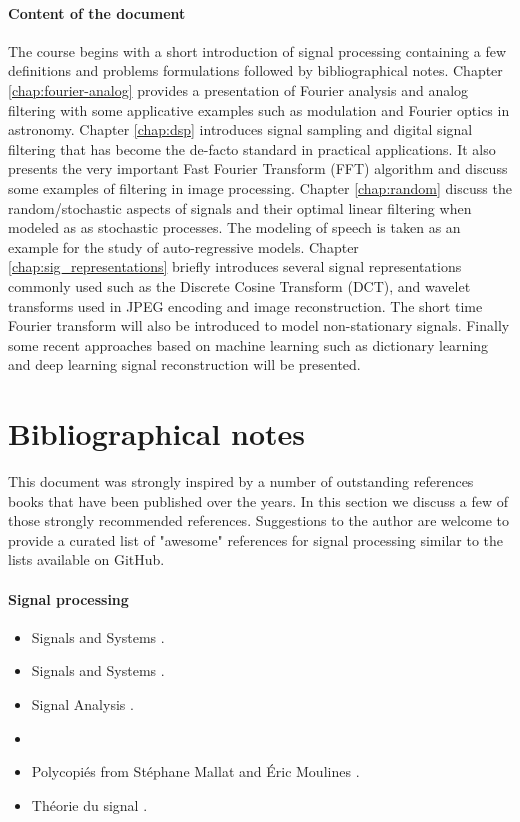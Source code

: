 \paragraph{Content of the document} The course begins with a short introduction
of signal processing containing a few definitions and problems formulations
followed by bibliographical notes. Chapter \ref{chap:fourier-analog} provides 
a presentation of Fourier analysis and analog filtering
with some applicative examples such as modulation and Fourier optics in
astronomy. Chapter \ref{chap:dsp} introduces signal sampling and digital signal filtering that has
become the de-facto standard in practical applications. It also presents the very
important Fast Fourier Transform (FFT) algorithm and discuss some examples of
filtering in image processing. Chapter \ref{chap:random} discuss the random/stochastic aspects of signals and their optimal linear
filtering when modeled as as stochastic processes. The
modeling of speech is taken as an example for the study of
auto-regressive models. Chapter \ref{chap:sig_representations} briefly
introduces  several
signal representations commonly used such as the Discrete Cosine Transform
(DCT), and wavelet transforms used in
JPEG encoding and image reconstruction. The short time Fourier transform will also be introduced to model
non-stationary signals. Finally some recent approaches based on machine learning
such as dictionary learning and deep learning signal reconstruction will be
presented.


\section{Bibliographical notes}

This document was strongly inspired by a number of outstanding references books that
have been published over the years. In this section we discuss a few of those
strongly recommended references.  Suggestions to the author are
welcome to provide a curated list of "awesome" references for signal processing
similar to the lists available on GitHub. 

\paragraph{Signal processing}

\begin{itemize}
    
    \item Signals and Systems \cite{haykin2007signals}.
    \item Signals and Systems \cite{oppenheim1997signals}.
    \item Signal Analysis \cite{papoulis1977signal}.
    \item[] \hspace{1cm}
    
    \item Polycopiés from Stéphane Mallat and Éric Moulines \cite{mallat2015traitement}.
    \item Théorie du signal \cite{jutten2018theorie}.   

\end{itemize}

